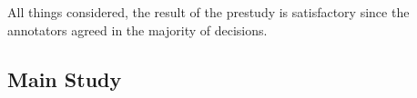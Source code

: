 All things considered, the result of the prestudy is satisfactory since the annotators agreed in the majority of decisions. 



\subsection{Main Study}
